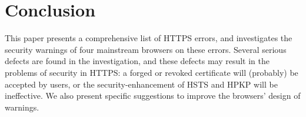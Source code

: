 \section{Conclusion}
This paper presents a comprehensive list of HTTPS errors,
 and investigates the security warnings of four mainstream browsers on these errors.
Several  serious defects are found in the investigation,
 and these defects may result in the problems of security in HTTPS:
a forged or revoked certificate will (probably) be accepted by users,
    or the security-enhancement of HSTS and HPKP will be ineffective.
We also present specific suggestions to improve the browsers' design of warnings.

